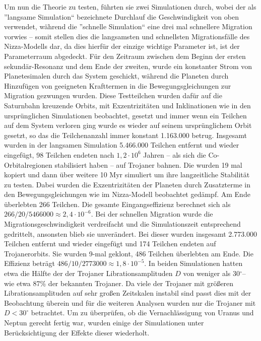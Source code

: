 \documentclass[10pt,a4paper,twoside]{article}
\newcommand{\degree}{$^\circ$}
\begin{document}
Um nun die Theorie zu testen, führten sie zwei Simulationen durch,
wobei der als ''langsame Simulation`` bezeichnete Durchlauf die Geschwindigkeit von oben verwendet, während die ''schnelle Simulation`` eine drei mal schnellere Migration vorwies – somit stellen dies die langsamsten und schnellsten Migrationsfälle des Nizza-Modells dar, da dies hierfür der einzige wichtige Parameter ist, ist der Parameterraum abgedeckt. %
Für den Zeitraum zwischen dem Beginn der ersten sekundär-Resonanz und dem Ende der zweiten, wurde ein konstanter Strom von Planetesimalen durch das System geschickt,
während die Planeten durch Hinzufügen von geeigneten Krafttermen in die Bewegungsgleichungen zur Migration gezwungen wurden.
Diese Testteilchen wurden dafür auf die Saturnbahn kreuzende Orbits, mit Exzentrizitäten und Inklinationen wie in den ursprünglichen Simulationen beobachtet, gesetzt und immer wenn ein Teilchen auf dem System verloren ging wurde es wieder auf seinem ursprünglichem Orbit gesetzt, so das die Teilchenanzahl immer konstant 1.163.000 betrug.
Insgesamt wurden in der langsamen Simulation 5.466.000 Teilchen entfernt und wieder eingefügt, 98 Teilchen endeten nach $1,2 \cdot 10^6$ Jahren – als sich die Co-Orbitalregionen stabilisiert haben – auf Trojaner bahnen.
Die wurden 19 mal kopiert und dann über weitere 10 Myr simuliert um ihre langzeitliche Stabilität zu testen.
Dabei wurden die Exzentrizitäten der Planeten durch Zusatzterme in den Bewegungsgleichungen wie im Nizza-Modell beobachtet gedämpf. Am Ende überlebten 266 Teilchen. Die gesamte Eingangseffizienz berechnet sich als $266/20/5466000 \approx 2,4 \cdot 10^{-6}$.
Bei der schnellen Migration wurde die Migrationsgeschwindigkeit verdreifacht und die Simulationszeit entsprechend gedrittelt, ansonsten blieb sie unverändert.
Bei dieser wurden insgesamt 2.773.000 Teilchen entfernt und wieder eingefügt und 174 Teilchen endeten auf Trojanerorbits. Sie wurden 9-mal geklont, 486 Teilchen überlebten am Ende.
Die Effizienz beträgt $486/10/2773000 \approx 1,8 \cdot 10^{-5}$.
In beiden Simulationen hatten etwa die Hälfte der der Trojaner Librationsamplituden $D$ von weniger als 30\degree – wie etwa 87\% der bekannten Trojaner.
Da viele der Trojaner mit größeren Librationsamplituden auf sehr großen Zeitskalen instabil sind passt dies mit der Beobachtung überein und für die weiteren Analysen wurden nur die Trojaner mit $D<30^\circ$ betrachtet.
Um zu überprüfen, ob die Vernachlässigung von Uranus und Neptun gerecht fertig %
war, wurden einige der Simulationen unter Berücksichtigung der Effekte dieser wiederholt. %
\end{document}
